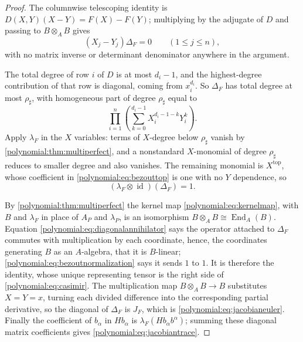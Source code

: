 \documentclass[11pt,letterpaper]{article}
\numberwithin{equation}{section}
\theoremstyle{definition}
\theoremstyle{remark}\newtheorem{remark}[theorem]{Remark}
\newcommand{\id}{\operatorname{id}}
\begin{document}
\begin{proof}
The columnwise telescoping identity is $D(X,Y)(X-Y)=F(X)-F(Y)$; multiplying by
the adjugate of $D$ and passing to $B\otimes_AB$ gives
\begin{equation}\label{polynomial:eq:diagonalannihilator}
 (X_j-Y_j)\Delta_F=0\qquad(1\le j\le n),
\end{equation}
with no matrix inverse or determinant denominator anywhere in the argument.

The total degree of row $i$ of $D$ is at most $d_i-1$, and the
highest-degree contribution of that row is diagonal, coming from
$x_i^{d_i}$. So $\Delta_F$ has total degree at most $\rho_\sharp$, with
homogeneous part of degree $\rho_\sharp$ equal to
\begin{equation}\label{polynomial:eq:bezouttop}
 \prod_{i=1}^n\left(\sum_{k=0}^{d_i-1}X_i^{d_i-1-k}Y_i^k\right).
\end{equation}
Apply $\lambda_F$ in the $X$ variables: terms of $X$-degree below
$\rho_\sharp$ vanish by \cref{polynomial:thm:multiperfect}, and a nonstandard
$X$-monomial of degree $\rho_\sharp$ reduces to smaller degree and also
vanishes. The remaining monomial is $X^{\mathrm{top}}$, whose coefficient in
\eqref{polynomial:eq:bezouttop} is one with no $Y$ dependence, so
\begin{equation}\label{polynomial:eq:bezoutnormalization}
 (\lambda_F\otimes\id)(\Delta_F)=1 .
\end{equation}

By \cref{polynomial:thm:multiperfect} the kernel map
\eqref{polynomial:eq:kernelmap}, with $B$ and $\lambda_F$ in place of $A_P$
and $\lambda_P$, is an isomorphism $B\otimes_AB\cong\operatorname{End}_A(B)$.
Equation \eqref{polynomial:eq:diagonalannihilator} says the operator attached
to $\Delta_F$ commutes with multiplication by each coordinate, hence, the
coordinates generating $B$ as an $A$-algebra, that it is $B$-linear;
\eqref{polynomial:eq:bezoutnormalization} says it sends $1$ to $1$. It is
therefore the identity, whose unique representing tensor is the right side of
\eqref{polynomial:eq:casimir}. The multiplication map $B\otimes_AB\to B$
substitutes $X=Y=x$, turning each divided difference into the corresponding
partial derivative, so the diagonal of $\Delta_F$ is $J_F$, which is
\eqref{polynomial:eq:jacobianeuler}. Finally the coefficient of $b_\alpha$ in
$Hb_\alpha$ is $\lambda_F(Hb_\alpha b^\alpha)$; summing these diagonal matrix
coefficients gives \eqref{polynomial:eq:jacobiantrace}.
\end{proof}
\end{document}
